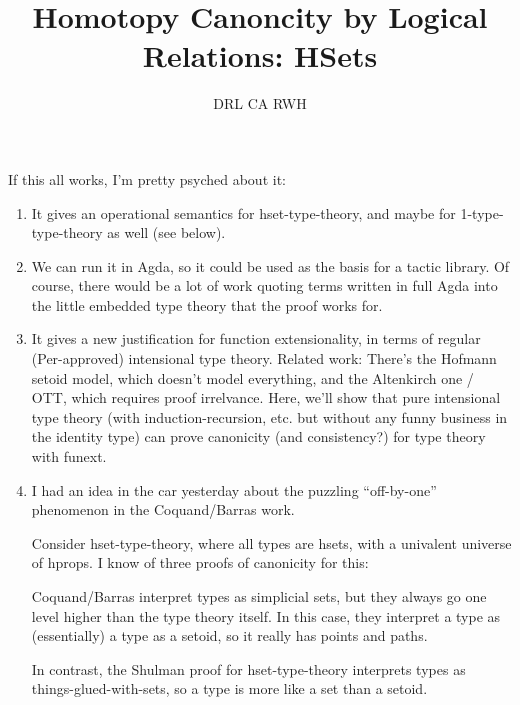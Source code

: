 \documentclass[10pt]{article}
\begin{document}
\title{Homotopy Canoncity by Logical Relations: HSets}


\author{DRL \qquad CA \qquad RWH}

\maketitle

If this all works, I'm pretty psyched about it:

\begin{enumerate}

\item It gives an operational semantics for hset-type-theory, and maybe
  for 1-type-type-theory as well (see below).  

\item We can run it in Agda, so it could be used as the basis for a
  tactic library.  Of course, there would be a lot of work quoting terms
  written in full Agda into the little embedded type theory that the
  proof works for.  

\item It gives a new justification for function extensionality, in terms
  of regular (Per-approved) intensional type theory.  Related work: There's the
  Hofmann setoid model, which doesn't model everything, and the
  Altenkirch one / OTT, which requires proof irrelvance.  Here, we'll
  show that pure intensional type theory (with induction-recursion,
  etc. but without any funny business in the identity type) can prove
  canonicity (and consistency?) for type theory with funext.  

\item I had an idea in the car yesterday about the puzzling
  ``off-by-one'' phenomenon in the Coquand/Barras work.  

  Consider hset-type-theory, where all types are hsets, with a univalent
  universe of hprops.  I know of three proofs of canonicity for this:

  Coquand/Barras interpret types as simplicial sets, but they always go
  one level higher than the type theory itself.  In this case, they
  interpret a type as (essentially) a type as a setoid, so it really has
  points and paths.

  In contrast, the Shulman proof for hset-type-theory interprets types
  as things-glued-with-sets, so a type is more like a set than a setoid.


\end{enumerate}
\end{document}
